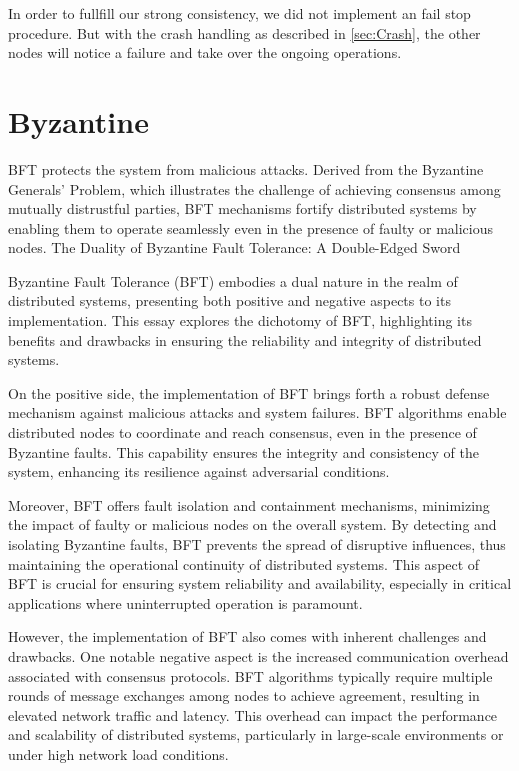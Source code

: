 In order to fullfill our strong consistency, we did not implement an fail stop procedure. But with the crash handling as described in \ref{sec:Crash}, the other nodes will notice a failure and take over the ongoing operations.
\section{Byzantine}\label{sec:Byzantine}
\ac{BFT} protects the system from malicious attacks. Derived from the Byzantine Generals' Problem, which illustrates the challenge of achieving 
consensus among mutually distrustful parties, BFT mechanisms fortify distributed systems by enabling them to operate seamlessly even in the presence of faulty or malicious nodes.
The Duality of Byzantine Fault Tolerance: A Double-Edged Sword

Byzantine Fault Tolerance (BFT) embodies a dual nature in the realm of distributed systems, presenting both positive and negative aspects to its implementation. This essay explores the dichotomy of BFT, highlighting its benefits and drawbacks in ensuring the reliability and integrity of distributed systems.

On the positive side, the implementation of BFT brings forth a robust defense mechanism against malicious attacks and system failures. BFT algorithms enable distributed nodes to coordinate and reach consensus, even in the presence of Byzantine faults. This capability ensures the integrity and consistency of the system, enhancing its resilience against adversarial conditions.

Moreover, BFT offers fault isolation and containment mechanisms, minimizing the impact of faulty or malicious nodes on the overall system. By detecting and isolating Byzantine faults, BFT prevents the spread of disruptive influences, thus maintaining the operational continuity of distributed systems. This aspect of BFT is crucial for ensuring system reliability and availability, especially in critical applications where uninterrupted operation is paramount.

However, the implementation of BFT also comes with inherent challenges and drawbacks. One notable negative aspect is the increased communication overhead associated with consensus protocols. BFT algorithms typically require multiple rounds of message exchanges among nodes to achieve agreement, resulting in elevated network traffic and latency. This overhead can impact the performance and scalability of distributed systems, particularly in large-scale environments or under high network load conditions.

